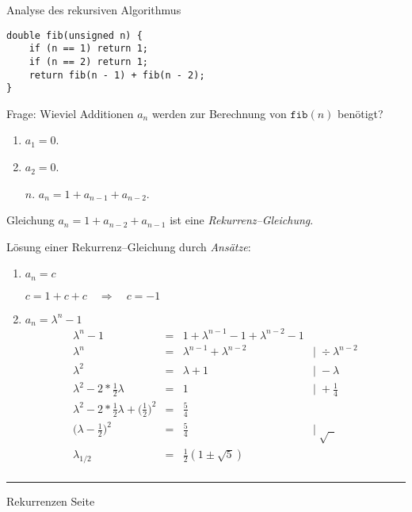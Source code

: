 \begin{slide}{}
\normalsize

\begin{center}
Analyse des rekursiven Algorithmus
\end{center}
\vspace*{0.5cm}

\footnotesize
\begin{verbatim}
double fib(unsigned n) {
    if (n == 1) return 1;
    if (n == 2) return 1;
    return fib(n - 1) + fib(n - 2);
}
\end{verbatim}
Frage: Wieviel Additionen $a_n$ werden zur Berechnung von $\texttt{fib}(n)$ ben\"otigt?
\begin{enumerate}
\item $a_1 = 0$.
\item $a_2 = 0$.
\item[$n$.] $a_n = 1 + a_{n - 1} + a_{n - 2}$.
\end{enumerate}
Gleichung $a_n = 1 + a_{n-2} + a_{n-1}$ ist eine \emph{Rekurrenz--Gleichung}.

L\"osung einer Rekurrenz--Gleichung durch \emph{Ans\"atze}:
\begin{enumerate}
\item $a_n = c$

      $c = 1 + c + c \quad\Rightarrow\quad c = - 1$
\item  $a_n = \lambda^n - 1$
      $$
      \begin{array}{ccll}
        \lambda^n - 1 & = & 1 + \lambda^{n-1} - 1 + \lambda^{n-2} - 1 & \\[0.3cm]
        \lambda^n     & = & \lambda^{n-1} + \lambda^{n-2}             & |\;\div \lambda^{n-2} \\[0.3cm]
        \lambda^2     & = & \lambda + 1                               & |\;- \lambda \\[0.3cm]
        \lambda^2 - 2 * \frac{1}{2} \lambda & = & 1                   & |\;+ \frac{1}{4} \\[0.3cm]
        \lambda^2 - 2 * \frac{1}{2} \lambda + \Big(\frac{1}{2}\Big)^2 & = &  \frac{5}{4} &  \\[0.3cm]
        \Big(\lambda -\frac{1}{2}\Big)^2 & = & \frac{5}{4}         & |\;\sqrt{\;\;} \\[0.3cm]
        \lambda_{1/2}  & = & \frac{1}{2} (1 \pm \sqrt{5}) & \\
      \end{array}
      $$  

\end{enumerate}


\vspace*{\fill}
\tiny \addtocounter{mypage}{1}
\rule{17cm}{1mm}
Rekurrenzen  \hspace*{\fill} Seite 
\end{slide}

